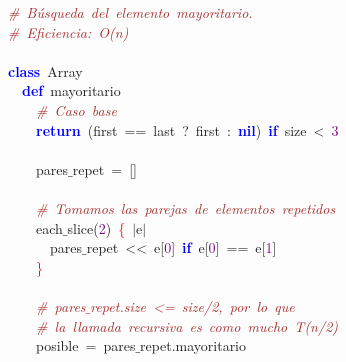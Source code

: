 \noindent
\mbox{}\textit{\textcolor{Brown}{\#\ Búsqueda\ del\ elemento\ mayoritario.}} \\
\mbox{}\textit{\textcolor{Brown}{\#\ Eficiencia:\ O(n)}} \\
\mbox{} \\
\mbox{}\textbf{\textcolor{Blue}{class}}\ Array \\
\mbox{}\ \ \textbf{\textcolor{Blue}{def}}\ mayoritario \\
\mbox{}\ \ \ \ \textit{\textcolor{Brown}{\#\ Caso\ base}} \\
\mbox{}\ \ \ \ \textbf{\textcolor{Blue}{return}}\ \textcolor{BrickRed}{(}first\ \textcolor{BrickRed}{==}\ last\ \textcolor{BrickRed}{?}\ first\ \textcolor{BrickRed}{:}\ \textbf{\textcolor{Blue}{nil}}\textcolor{BrickRed}{)}\ \textbf{\textcolor{Blue}{if}}\ size\ \textcolor{BrickRed}{\textless{}}\ \textcolor{Purple}{3} \\
\mbox{}\ \ \ \  \\
\mbox{}\ \ \ \ pares$\_$repet\ \textcolor{BrickRed}{=}\ \textcolor{BrickRed}{[]} \\
\mbox{} \\
\mbox{}\ \ \ \ \textit{\textcolor{Brown}{\#\ Tomamos\ las\ parejas\ de\ elementos\ repetidos}} \\
\mbox{}\ \ \ \ each$\_$slice\textcolor{BrickRed}{(}\textcolor{Purple}{2}\textcolor{BrickRed}{)}\ \textcolor{Red}{\{}\ \textcolor{BrickRed}{$|$}e\textcolor{BrickRed}{$|$} \\
\mbox{}\ \ \ \ \ \ pares$\_$repet\ \textcolor{BrickRed}{\textless{}\textless{}}\ e\textcolor{BrickRed}{[}\textcolor{Purple}{0}\textcolor{BrickRed}{]}\ \textbf{\textcolor{Blue}{if}}\ e\textcolor{BrickRed}{[}\textcolor{Purple}{0}\textcolor{BrickRed}{]}\ \textcolor{BrickRed}{==}\ e\textcolor{BrickRed}{[}\textcolor{Purple}{1}\textcolor{BrickRed}{]} \\
\mbox{}\ \ \ \ \textcolor{Red}{\}} \\
\mbox{} \\
\mbox{}\ \ \ \ \textit{\textcolor{Brown}{\#\ pares$\_$repet.size\ \textless{}=\ size/2,\ por\ lo\ que}} \\
\mbox{}\ \ \ \ \textit{\textcolor{Brown}{\#\ la\ llamada\ recursiva\ es\ como\ mucho\ T(n/2)}} \\
\mbox{}\ \ \ \ posible\ \textcolor{BrickRed}{=}\ pares$\_$repet\textcolor{BrickRed}{.}mayoritario \\
\mbox{} \\
